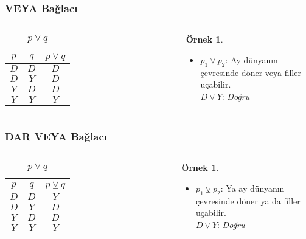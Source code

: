 \documentclass[dvipsnames]{beamer}
\theoremstyle{definition}
\theoremstyle{example}
\newtheorem{ornek}[theorem]{Örnek}
\theoremstyle{plain}
\begin{document}
\begin{frame}
  \frametitle{VEYA Bağlacı}

  \begin{columns}
    \begin{table}
      \caption{$p \vee q$}
      \begin{tabular}{|c|c||c|}\hline
        $p$ & $q$ & $p \vee q$\\\hline\hline
        $D$ & $D$ & $D$       \\\hline
        $D$ & $Y$ & $D$       \\\hline
        $Y$ & $D$ & $D$       \\\hline
        $Y$ & $Y$ & $Y$       \\\hline
      \end{tabular}
    \end{table}

    \pause
    \begin{ornek}
      \begin{itemize}
        \item $p_1 \vee p_2$: Ay dünyanın çevresinde döner veya filler
          uçabilir.\\
          $D \vee Y$: \emph{Doğru}
      \end{itemize}
    \end{ornek}
  \end{columns}
\end{frame}

\begin{frame}
  \frametitle{DAR VEYA Bağlacı}

  \begin{columns}
    \begin{table}
      \caption{$p \veebar q$}
      \begin{tabular}{|c|c||c|}\hline
        $p$ & $q$ & $p \veebar q$\\\hline\hline
        $D$ & $D$ & $Y$          \\\hline
        $D$ & $Y$ & $D$          \\\hline
        $Y$ & $D$ & $D$          \\\hline
        $Y$ & $Y$ & $Y$          \\\hline
      \end{tabular}
    \end{table}

    \pause
    \begin{ornek}
      \begin{itemize}
        \item $p_1 \veebar p_2$: Ya ay dünyanın çevresinde döner ya da filler
          uçabilir.\\
          $D \veebar Y$: \emph{Doğru}
      \end{itemize}
    \end{ornek}
  \end{columns}
\end{frame}
\end{document}
